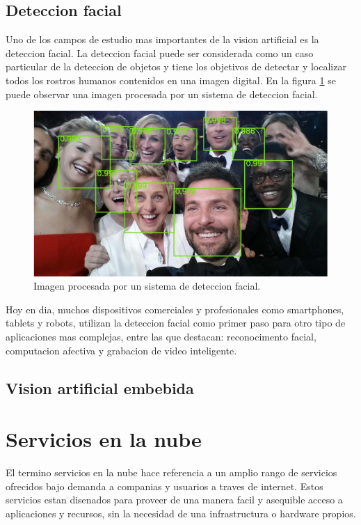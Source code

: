 
\subsection{Deteccion facial}
Uno de los campos de estudio mas importantes de la vision artificial es la deteccion facial. La deteccion facial puede ser considerada como un caso particular de la deteccion de objetos y tiene los objetivos de detectar y localizar todos los rostros humanos contenidos en una imagen digital. En la figura \ref{fig:mv_fd} se puede observar una imagen procesada por un sistema de deteccion facial.

\begin{figure}[h]
	\centering
	\includegraphics[scale=0.5]{./Figures/mv_fd.jpeg}
	\caption{Imagen procesada por un sistema de deteccion facial.}
	\label{fig:mv_fd}
\end{figure}

Hoy en dia, muchos dispositivos comerciales y profesionales como smartphones, tablets y robots, utilizan la deteccion facial como primer paso para otro tipo de aplicaciones mas complejas, entre las que destacan: reconocimento facial, computacion afectiva y grabacion de video inteligente.

\subsection{Vision artificial embebida}


\section{Servicios en la nube}
El termino servicios en la nube hace referencia a un amplio rango de servicios ofrecidos bajo demanda a companias y usuarios a traves de internet. Estos servicios estan disenados para proveer de una manera facil y asequible acceso a aplicaciones y recursos, sin la necesidad de una infrastructura o hardware propios.

